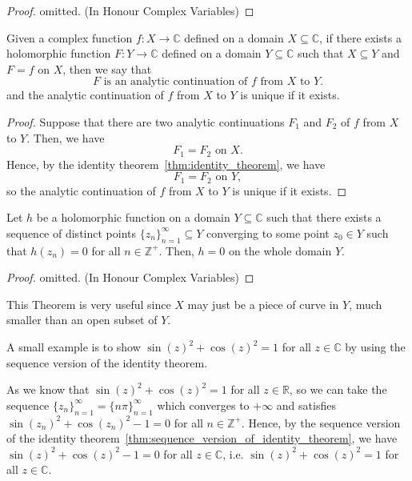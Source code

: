 \documentclass{elegantbook}
\begin{document}
\begin{proof}
  omitted. (In Honour Complex Variables)
\end{proof}

\begin{theorem}
  Given a complex function $f:X\to\mathbb{C}$ defined on a domain $X\subseteq \mathbb{C}$, if there exists a holomorphic function $F:Y\to\mathbb{C}$ defined on a domain $Y\subseteq \mathbb{C}$ such that $X\subseteq Y$ and $F=f$ on $X$, then we say that
  \[
  F \text{ is an analytic continuation of } f \text{ from } X \text{ to } Y.
  \]
  and the analytic continuation of $f$ from $X$ to $Y$ is unique if it exists.
\end{theorem}

\begin{proof}
  Suppose that there are two analytic continuations $F_1$ and $F_2$ of $f$ from $X$ to $Y$. Then, we have
  \[
    F_1 = F_2 \text{ on } X.
  \]
  Hence, by the identity theorem~\ref{thm:identity_theorem}, we have
  \[
    F_1 = F_2 \text{ on } Y,
  \]
  so the analytic continuation of $f$ from $X$ to $Y$ is unique if it exists.
\end{proof}

\begin{theorem} \label{thm:sequence_version_of_identity_theorem}
  Let $h$ be a holomorphic function on a domain $Y \subseteq \mathbb{C}$ such that there exists a sequence of distinct points $\{z_n\}_{n=1}^{\infty} \subseteq Y$ converging to some point $z_0 \in Y$ such that $h(z_n) = 0$ for all $n\in\mathbb{Z}^+$. Then, $h=0$ on the whole domain $Y$.
\end{theorem}

\begin{proof}
  omitted. (In Honour Complex Variables)
\end{proof}

\begin{note}
  This Theorem is very useful since $X$ may just be a piece of curve in $Y$, much smaller than an open subset of $Y$. 
\end{note}

\begin{exercise}
  A small example is to show $\sin(z)^2+\cos(z)^2=1$ for all $z\in\mathbb{C}$ by using the sequence version of the identity theorem. 

  As we know that $\sin(z)^2+\cos(z)^2=1$ for all $z\in\mathbb{R}$, so we can take the sequence $\{z_n\}_{n=1}^{\infty} = \{n\pi\}_{n=1}^{\infty}$ which converges to $+\infty$ and satisfies $\sin(z_n)^2+\cos(z_n)^2-1=0$ for all $n\in\mathbb{Z}^+$. Hence, by the sequence version of the identity theorem~\ref{thm:sequence_version_of_identity_theorem}, we have $\sin(z)^2+\cos(z)^2-1=0$ for all $z\in\mathbb{C}$, i.e. $\sin(z)^2+\cos(z)^2=1$ for all $z\in\mathbb{C}$.
\end{exercise}
\end{document}
